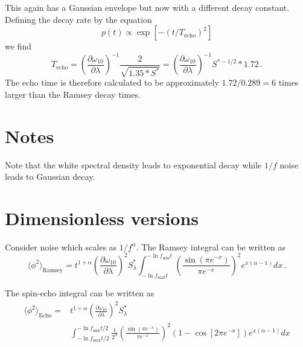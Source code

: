 \documentclass{article}
\begin{document}
This again has a Gaussian envelope but now with a different decay constant.
Defining the decay rate by the equation
\begin{equation}
p(t) \propto \exp \left[ - \left( t / T_{\textrm{echo}} \right)^2 \right]
\end{equation}
we find
\begin{equation}
T_{\textrm{echo}}
= \left( \frac{\partial\omega_{10}}{\partial\lambda} \right)^{-1} \frac{2}{\sqrt{1.35*S^{*}}}
= \left( \frac{\partial\omega_{10}}{\partial\lambda} \right)^{-1} S^{*-1/2} * 1.72 \, .
\end{equation}
The echo time is therefore calculated to be approximately $1.72/0.289=6$ times larger than the Ramsey decay times.


\section{Notes}

Note that the white spectral density leads to exponential decay while $1/f$ noise leads to Gaussian decay.


\section{Dimensionless versions}

Consider noise which scales as $1/f^{\alpha}$.
The Ramsey integral can be written as
\begin{equation}
\langle \phi^2 \rangle_{\textrm{Ramsey}}
= t^{1+\alpha} \left( \frac{\partial\omega_{10}} {\partial\lambda} \right)^2 S^*_{\lambda} \int_{-\ln f_{\textrm{max}}t}^{-\ln f_{\textrm{min}}t} \left(\frac{\sin(\pi e^{-x})}{\pi e^{-x}}\right)^2 e^{x(\alpha-1)} dx \, .
\end{equation}

The spin-echo integral can be written as
\begin{align}
\langle \phi^2 \rangle_{\textrm{Echo}} =
& t^{1+\alpha} \left( \frac{\partial\omega_{10}} {\partial\lambda} \right)^2 S^*_{\lambda} \nonumber \\
& \int_{-\ln f_{\textrm{max}}t/2}^{-\ln f_{\textrm{min}}t/2} \frac{1}{2^{\alpha}} \left( \frac{\sin(\pi e^{-x})}{\pi e^{-x}}\right)^2 (1-\cos[2\pi e^{-x}]) e^{x(\alpha-1)} dx
\end{align}
\end{document}
